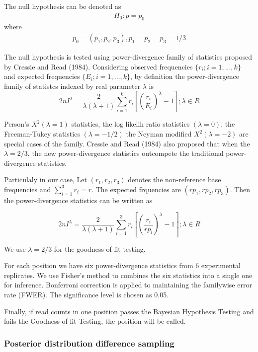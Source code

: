 \documentclass[11pt,reqno]{amsart}
\begin{document}
The null hypothesis can be denoted as
\begin{align}
 H_0: p=p_0
\end{align}
where
\begin{align} 
 p_0=(p_1,p_2,p_3), p_1=p_2=p_3=1/3
\end{align}

The null hypothesis is tested using power-divergence family of statistics proposed by Cressie and Read (1984). Considering observed frequencies $\{r_i; i=1,...,k\}$ and expected frequencies $\{E_i; i=1,...,k\}$, by definition the power-divergence family of statistcs indexed by real parameter $\lambda$ is 
\begin{equation}
 2nI^\lambda = \frac{2}{\lambda(\lambda+1)}\sum_{i=1}^k r_i \left[\left(\frac{r_i}{E_i}\right)^\lambda-1\right];\lambda \in R
\end{equation}

Person's $X^2 (\lambda = 1)$ statistics, the log likelih ratio statistics $(\lambda = 0)$, the Freeman-Tukey statistics $(\lambda = -1/2)$ the Neyman modified $X^2 (\lambda = -2)$ are special cases of the family. Cressie and Read (1984) also proposed that when the $\lambda =2/3$, the new power-divergence statistics outcompete the traditional power-divergence statistics. 

Particulaly in our case, Let $(r_1,r_2,r_3)$ denotes the non-reference base frequencies and $\sum_{i=1}^3 r_i = r$. The expected frquencies are $(rp_1, rp_2, rp_3)$. Then the power-divergence statistics can be written as

\begin{equation}
 2nI^\lambda = \frac{2}{\lambda(\lambda+1)}\sum_{i=1}^3 r_i \left[\left(\frac{r_i}{rp_i}\right)^\lambda-1\right];\lambda \in R
\end{equation}

We use $\lambda =2/3$ for the goodness of fit testing.

For each position we have six power-divergence statistics from 6 experimental replicates. We use Fisher's method to combines the six statistics into a single one for inference. Bonferroni correction is applied to maintaining the familywise error rate (FWER). The significance level is chosen as 0.05.

Finally, if read counts in one position passes the Bayesian Hypothesis Testing and fails the Goodness-of-fit Testing, the position will be called.


\subsubsection{Posterior distribution difference sampling}\
\end{document}
